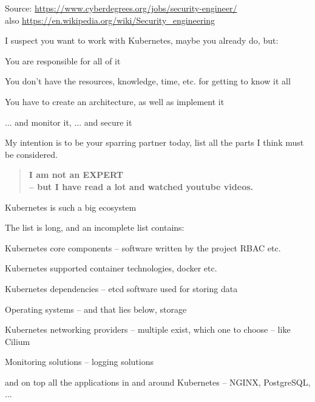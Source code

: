 \documentclass[Screen16to9,17pt]{foils}
\begin{document}
Source: \url{https://www.cyberdegrees.org/jobs/security-engineer/}\\
also
\url{https://en.wikipedia.org/wiki/Security_engineering}





I suspect you want to work with Kubernetes, maybe you already do, but:
\begin{list2}
\item You are responsible for all of it
\item You don't have the resources, knowledge, time, etc. for getting to know it all
\item You have to create an architecture, as well as implement it
\item ... and monitor it, ... and secure it
\end{list2}
My intention is to be your sparring partner today, list all the parts I think must be considered.




\begin{quote}
\large \bf I am not an EXPERT \\
-- but I have read a lot and watched youtube videos. \smiley
\end{quote}

\begin{list1}
\item Kubernetes is such a big ecosystem
\item The list is long, and an incomplete list contains:
\begin{list2}
\item Kubernetes core components -- software written by the project RBAC etc.
\item Kubernetes supported container technologies, docker etc.
\item Kubernetes dependencies -- etcd software used for storing data
\item Operating systems -- and that lies below, storage
\item Kubernetes networking providers -- multiple exist, which one to choose -- like Cilium
\item Monitoring solutions -- logging solutions
\end{list2}
\item and on top all the applications in and around Kubernetes -- NGINX, PostgreSQL, ...
\end{list1}
\end{document}
